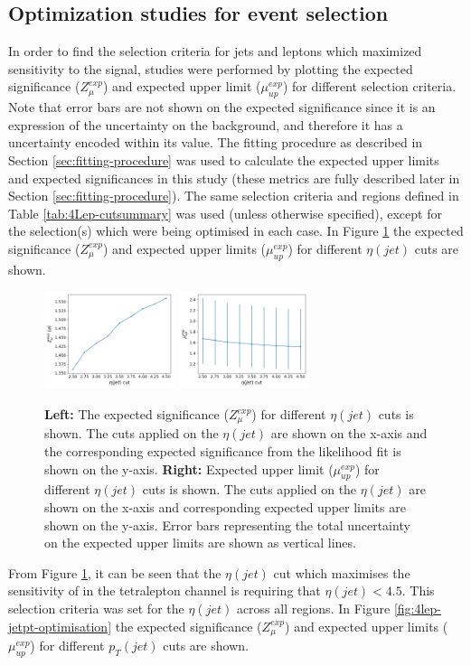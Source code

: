 \subsection{Optimization studies for event selection}
\label{sec:optimization-studies-tetra}
In order to find the selection criteria for jets and leptons which maximized sensitivity to the \tWZ signal, studies were performed by plotting the expected significance ($Z_{\mu}^{exp}$) and expected upper limit ($\mu_{up}^{exp}$) for different selection criteria. Note that error bars are not shown on the expected significance since it is an expression of the uncertainty on the background, and therefore it has a uncertainty encoded within its value. The fitting procedure as described in Section \ref{sec:fitting-procedure} was used to calculate the expected upper limits and expected significances in this study (these metrics are fully described later in Section \ref{sec:fitting-procedure}). The same selection criteria and regions defined in Table \ref{tab:4Lep-cutsummary} was used (unless otherwise specified), except for the selection(s) which were being optimised in each case. In Figure \ref{fig:4lep-jetEta-optimisation} the expected significance ($Z_{\mu}^{exp}$) and expected upper limits ($\mu_{up}^{exp}$) for different $\eta(jet)$ cuts are shown. 
\begin{figure}[h!]
	\includegraphics[width = 0.34\textwidth]{figures/signif_jetEta.png}
  	\includegraphics[width = 0.34\textwidth]{figures/exp_upper_jetEta.png}
  \centering
	\caption{\textbf{Left:} The expected significance ($Z_{\mu}^{exp}$) for different $\eta(jet)$ cuts is shown. The cuts applied on the $\eta(jet)$ are shown on the x-axis and the corresponding expected significance from the likelihood fit is shown on the y-axis. \textbf{Right:} Expected upper limit ($\mu_{up}^{exp}$) for different $\eta(jet)$ cuts is shown. The cuts applied on the $\eta(jet)$ are shown on the x-axis and corresponding expected upper limits are shown on the y-axis. Error bars representing the total uncertainty on the expected upper limits are shown as vertical lines.}
	\label{fig:4lep-jetEta-optimisation}
\end{figure}From Figure \ref{fig:4lep-jetEta-optimisation}, it can be seen that the $\eta(jet)$ cut which maximises the sensitivity of \tWZ in the tetralepton channel is requiring that $\eta(jet) < 4.5$. This selection criteria was set for the $\eta(jet)$ across all regions. In Figure \ref{fig:4lep-jetpt-optimisation} the expected significance ($Z_{\mu}^{exp}$) and expected upper limits ($\mu_{up}^{exp}$) for different $p_{T}(jet)$ cuts are shown.
